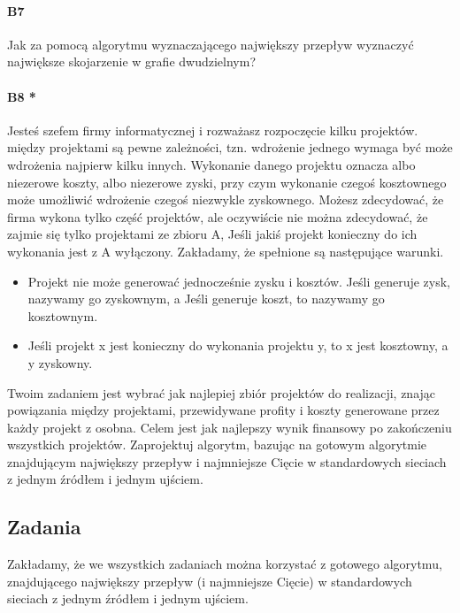 \documentclass[a4paper,12pt]{article}
\theoremstyle{definition}%
\theoremstyle{definition}
\theoremstyle{problem}
\begin{document}
\paragraph{B7} Jak za pomocą algorytmu wyznaczającego największy przepływ wyznaczyć największe skojarzenie w grafie dwudzielnym?

\paragraph{B8 * } Jesteś szefem firmy informatycznej i rozważasz rozpoczęcie kilku projektów. między projektami są pewne zależności, tzn. wdrożenie jednego wymaga być może wdrożenia najpierw kilku innych. Wykonanie danego projektu oznacza albo niezerowe koszty, albo niezerowe zyski, przy czym wykonanie czegoś kosztownego może umożliwić wdrożenie czegoś niezwykle zyskownego. Możesz zdecydować, że firma wykona tylko część projektów, ale oczywiście nie można zdecydować, że zajmie się tylko projektami ze zbioru A, Jeśli jakiś projekt konieczny do ich wykonania jest z A wyłączony. Zakładamy, że spełnione są następujące warunki.
\begin{itemize}
\item Projekt nie może generować jednocześnie zysku i kosztów. Jeśli generuje zysk, nazywamy go zyskownym, a Jeśli generuje koszt, to nazywamy go kosztownym.
\item Jeśli projekt x jest konieczny do wykonania projektu y, to x jest kosztowny, a y zyskowny.
\end{itemize}
Twoim zadaniem jest wybrać jak najlepiej zbiór projektów do realizacji, znając powiązania między projektami, przewidywane profity i koszty generowane przez każdy projekt z osobna. Celem jest jak najlepszy wynik finansowy po zakończeniu wszystkich projektów. Zaprojektuj algorytm, bazując na gotowym algorytmie znajdującym największy przepływ i najmniejsze Cięcie w standardowych sieciach z jednym źródłem i jednym ujściem.


\subsection{Zadania}
Zakładamy, że we wszystkich zadaniach można korzystać z gotowego algorytmu, znajdującego największy przepływ (i najmniejsze Cięcie) w standardowych sieciach z jednym źródłem i jednym ujściem.
\end{document}
